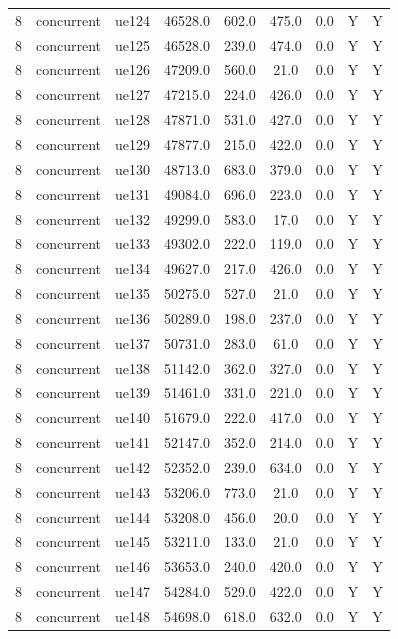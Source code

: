 \begin{table}[ht]
\begin{tabular}{|c|c|c|c|c|c|c|c|c|}
8 & concurrent & ue124 & 46528.0 & 602.0 & 475.0 & 0.0 & Y & Y \\
8 & concurrent & ue125 & 46528.0 & 239.0 & 474.0 & 0.0 & Y & Y \\
8 & concurrent & ue126 & 47209.0 & 560.0 & 21.0 & 0.0 & Y & Y \\
8 & concurrent & ue127 & 47215.0 & 224.0 & 426.0 & 0.0 & Y & Y \\
8 & concurrent & ue128 & 47871.0 & 531.0 & 427.0 & 0.0 & Y & Y \\
8 & concurrent & ue129 & 47877.0 & 215.0 & 422.0 & 0.0 & Y & Y \\
8 & concurrent & ue130 & 48713.0 & 683.0 & 379.0 & 0.0 & Y & Y \\
8 & concurrent & ue131 & 49084.0 & 696.0 & 223.0 & 0.0 & Y & Y \\
8 & concurrent & ue132 & 49299.0 & 583.0 & 17.0 & 0.0 & Y & Y \\
8 & concurrent & ue133 & 49302.0 & 222.0 & 119.0 & 0.0 & Y & Y \\
8 & concurrent & ue134 & 49627.0 & 217.0 & 426.0 & 0.0 & Y & Y \\
8 & concurrent & ue135 & 50275.0 & 527.0 & 21.0 & 0.0 & Y & Y \\
8 & concurrent & ue136 & 50289.0 & 198.0 & 237.0 & 0.0 & Y & Y \\
8 & concurrent & ue137 & 50731.0 & 283.0 & 61.0 & 0.0 & Y & Y \\
8 & concurrent & ue138 & 51142.0 & 362.0 & 327.0 & 0.0 & Y & Y \\
8 & concurrent & ue139 & 51461.0 & 331.0 & 221.0 & 0.0 & Y & Y \\
8 & concurrent & ue140 & 51679.0 & 222.0 & 417.0 & 0.0 & Y & Y \\
8 & concurrent & ue141 & 52147.0 & 352.0 & 214.0 & 0.0 & Y & Y \\
8 & concurrent & ue142 & 52352.0 & 239.0 & 634.0 & 0.0 & Y & Y \\
8 & concurrent & ue143 & 53206.0 & 773.0 & 21.0 & 0.0 & Y & Y \\
8 & concurrent & ue144 & 53208.0 & 456.0 & 20.0 & 0.0 & Y & Y \\
8 & concurrent & ue145 & 53211.0 & 133.0 & 21.0 & 0.0 & Y & Y \\
8 & concurrent & ue146 & 53653.0 & 240.0 & 420.0 & 0.0 & Y & Y \\
8 & concurrent & ue147 & 54284.0 & 529.0 & 422.0 & 0.0 & Y & Y \\
8 & concurrent & ue148 & 54698.0 & 618.0 & 632.0 & 0.0 & Y & Y \\

\end{tabular}
\end{table}

